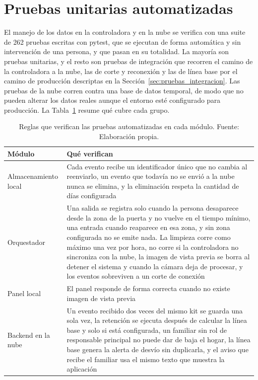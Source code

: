 \section{Pruebas unitarias automatizadas}
\label{sec:pruebas_unitarias}

El manejo de los datos en la controladora y en la nube se verifica con una suite de 262 pruebas escritas con pytest, que se ejecutan de forma automática y sin intervención de una persona, y que pasan en su totalidad.
La mayoría son pruebas unitarias, y el resto son pruebas de integración que recorren el camino de la controladora a la nube, las de corte y reconexión y las de línea base por el camino de producción descriptas en la Sección~\ref{sec:pruebas_integracion}.
Las pruebas de la nube corren contra una base de datos temporal, de modo que no pueden alterar los datos reales aunque el entorno esté configurado para producción.
La Tabla~\ref{tab:pruebas_unitarias} resume qué cubre cada grupo.

\begin{table}[H]
\centering
\caption[Pruebas automatizadas por módulo.]{Reglas que verifican las pruebas automatizadas en cada módulo. Fuente: Elaboración propia.}
\label{tab:pruebas_unitarias}
\small
\begin{tabular}{@{}p{3.4cm}p{11cm}@{}}
\toprule
\textbf{Módulo} & \textbf{Qué verifican} \\
\midrule
Almacenamiento local & Cada evento recibe un identificador único que no cambia al reenviarlo, un evento que todavía no se envió a la nube nunca se elimina, y la eliminación respeta la cantidad de días configurada \\
Orquestador & Una salida se registra solo cuando la persona desaparece desde la zona de la puerta y no vuelve en el tiempo mínimo, una entrada cuando reaparece en esa zona, y sin zona configurada no se emite nada. La limpieza corre como máximo una vez por hora, no corre si la controladora no sincroniza con la nube, la imagen de vista previa se borra al detener el sistema y cuando la cámara deja de procesar, y los eventos sobreviven a un corte de conexión \\
Panel local & El panel responde de forma correcta cuando no existe imagen de vista previa \\
Backend en la nube & Un evento recibido dos veces del mismo kit se guarda una sola vez, la retención se ejecuta después de calcular la línea base y solo si está configurada, un familiar sin rol de responsable principal no puede dar de baja el hogar, la línea base genera la alerta de desvío sin duplicarla, y el aviso que recibe el familiar usa el mismo texto que muestra la aplicación \\
\bottomrule
\end{tabular}
\end{table}

